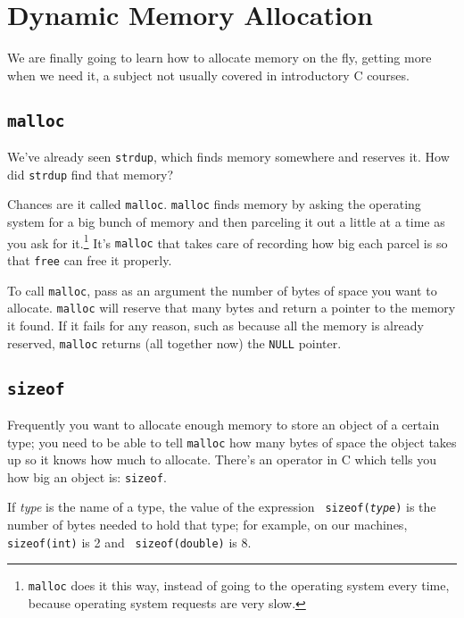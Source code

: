 %
%
%

\section{Dynamic Memory Allocation}

We are finally going to learn how to allocate memory on the fly, getting
more when we need it, a subject not usually covered in introductory C
courses.

\subsection{{\tt malloc}}

We've already seen {\tt strdup}, which finds memory somewhere and
reserves it.  How did {\tt strdup} find that memory?

Chances are it called {\tt malloc}.  {\tt malloc} finds memory by asking
the operating system for a big bunch of memory and then parceling it out
a little at a time as you ask for it.\footnote{{\tt malloc} does it this
way, instead of going to the operating system every time, because
operating system requests are very slow.} It's {\tt malloc} that takes
care of recording how big each parcel is so that {\tt free} can free it
properly.

To call {\tt malloc}, pass as an argument the number of bytes of space
you want to allocate.  {\tt malloc} will reserve that many bytes and
return a pointer to the memory it found.  If it fails for any reason,
such as because all the memory is already reserved, {\tt malloc} returns
(all together now) the {\tt NULL} pointer.  

\subsection{{\tt sizeof}}

Frequently you want to allocate enough memory to store an object of a
certain type; you need to be able to tell {\tt malloc} how many bytes of
space the object takes up so it knows how much to allocate.  There's an
operator in C which tells you how big an object is: {\tt sizeof}. 

If {\em type} is the name of a type, the value of the expression {\tt
sizeof({\em type}\/)} is the number of bytes needed to hold that type;
for example, on our machines, {\tt sizeof(int)} is 2 and {\tt
sizeof(double)} is 8.  

